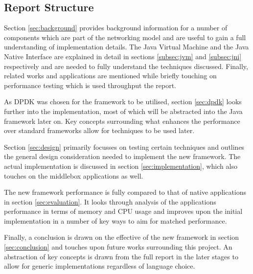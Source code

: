 \documentclass[final_report.tex]{subfiles}
\begin{document}
\subsection{Report Structure}
Section \ref{sec:background} provides background information for a number of components which are part of the networking model and are useful to gain a full understanding of implementation details. The Java Virtual Machine and the Java Native Interface are explained in detail in sections \ref{subsec:jvm} and \ref{subsec:jni} respectively and are needed to fully understand the techniques discussed. Finally, related works and applications are mentioned while briefly touching on performance testing which is used throughput the report.

As DPDK was chosen for the framework to be utilised, section \ref{sec:dpdk} looks further into the implementation, most of which will be abstracted into the Java framework later on. Key concepts surrounding what enhances the performance over standard frameworks allow for techniques to be used later.

Section \ref{sec:design} primarily focusses on testing certain techniques and outlines the general design consideration needed to implement the new framework. The actual implementation is discussed in section \ref{sec:implementation}, which also touches on the middlebox applications as well.

The new framework performance is fully compared to that of native applications in section \ref{sec:evaluation}. It looks through analysis of the applications performance in terms of memory and CPU usage and improves upon the initial implementation in a number of key ways to aim for matched performance.

Finally, a conclusion is drawn on the effective of the new framework in section \ref{sec:conclusion} and touches upon future works surrounding this project. An abstraction of key concepts is drawn from the full report in the later stages to allow for generic implementations regardless of language choice.
\end{document}

